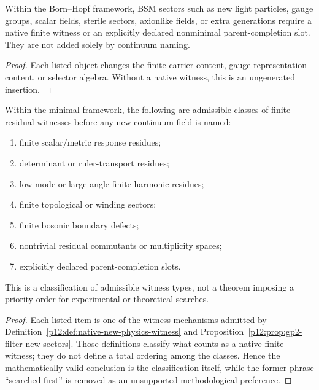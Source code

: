 \documentclass[12pt,a4paper]{article}
\begin{document}
\begin{corollary}
\label{p12:cor:finite-witness-bsm-sectors}
Within the Born--Hopf framework, BSM sectors such as new light particles, gauge groups, scalar fields, sterile sectors, axionlike fields, or extra generations require a native finite witness or an explicitly declared nonminimal parent-completion slot.  They are not added solely by continuum naming.
\end{corollary}

\begin{proof}
Each listed object changes the finite carrier content, gauge representation content, or selector algebra.  Without a native witness, this is an ungenerated insertion.
\end{proof}

\begin{corollary}
\label{p12:cor:where-new-physics-search}
Within the minimal framework, the following are admissible classes of finite residual witnesses before any new continuum field is named:
\begin{enumerate}[label=(\alph*), leftmargin=2em]
\item finite scalar/metric response residues;
\item determinant or ruler-transport residues;
\item low-mode or large-angle finite harmonic residues;
\item finite topological or winding sectors;
\item finite bosonic boundary defects;
\item nontrivial residual commutants or multiplicity spaces;
\item explicitly declared parent-completion slots.
\end{enumerate}
This is a classification of admissible witness types, not a theorem imposing a priority order for experimental or theoretical searches.
\end{corollary}
\begin{proof}
Each listed item is one of the witness mechanisms admitted by Definition~\ref{p12:def:native-new-physics-witness} and Proposition~\ref{p12:prop:gp2-filter-new-sectors}.  Those definitions classify what counts as a native finite witness; they do not define a total ordering among the classes.  Hence the mathematically valid conclusion is the classification itself, while the former phrase ``searched first'' is removed as an unsupported methodological preference.
\end{proof}
\end{document}

